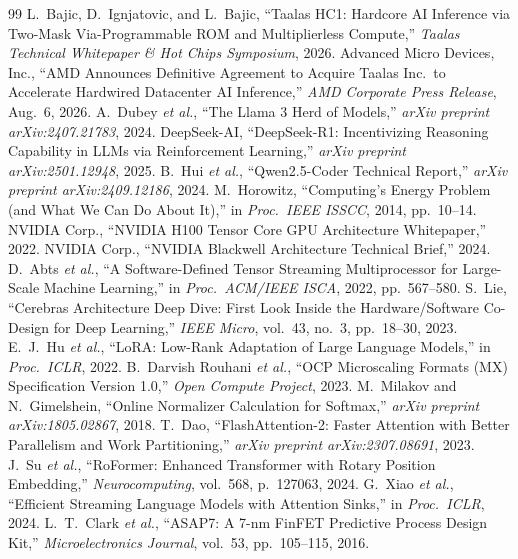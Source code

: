 \documentclass[10pt,journal,compsoc]{IEEEtran}
\begin{document}
\begin{thebibliography}{99}
 L.~Bajic, D.~Ignjatovic, and L.~Bajic, ``Taalas HC1: Hardcore AI Inference via Two-Mask Via-Programmable ROM and Multiplierless Compute,'' \emph{Taalas Technical Whitepaper \& Hot Chips Symposium}, 2026.
 Advanced Micro Devices, Inc., ``AMD Announces Definitive Agreement to Acquire Taalas Inc.\ to Accelerate Hardwired Datacenter AI Inference,'' \emph{AMD Corporate Press Release}, Aug.\ 6, 2026.
 A.~Dubey \emph{et al.}, ``The Llama 3 Herd of Models,'' \emph{arXiv preprint arXiv:2407.21783}, 2024.
 DeepSeek-AI, ``DeepSeek-R1: Incentivizing Reasoning Capability in LLMs via Reinforcement Learning,'' \emph{arXiv preprint arXiv:2501.12948}, 2025.
 B.~Hui \emph{et al.}, ``Qwen2.5-Coder Technical Report,'' \emph{arXiv preprint arXiv:2409.12186}, 2024.
 M.~Horowitz, ``Computing's Energy Problem (and What We Can Do About It),'' in \emph{Proc.\ IEEE ISSCC}, 2014, pp.\ 10--14.
 NVIDIA Corp., ``NVIDIA H100 Tensor Core GPU Architecture Whitepaper,'' 2022.
 NVIDIA Corp., ``NVIDIA Blackwell Architecture Technical Brief,'' 2024.
 D.~Abts \emph{et al.}, ``A Software-Defined Tensor Streaming Multiprocessor for Large-Scale Machine Learning,'' in \emph{Proc.\ ACM/IEEE ISCA}, 2022, pp.\ 567--580.
 S.~Lie, ``Cerebras Architecture Deep Dive: First Look Inside the Hardware/Software Co-Design for Deep Learning,'' \emph{IEEE Micro}, vol.\ 43, no.\ 3, pp.\ 18--30, 2023.
 E.~J.~Hu \emph{et al.}, ``LoRA: Low-Rank Adaptation of Large Language Models,'' in \emph{Proc.\ ICLR}, 2022.
 B.~Darvish Rouhani \emph{et al.}, ``OCP Microscaling Formats (MX) Specification Version 1.0,'' \emph{Open Compute Project}, 2023.
 M.~Milakov and N.~Gimelshein, ``Online Normalizer Calculation for Softmax,'' \emph{arXiv preprint arXiv:1805.02867}, 2018.
 T.~Dao, ``FlashAttention-2: Faster Attention with Better Parallelism and Work Partitioning,'' \emph{arXiv preprint arXiv:2307.08691}, 2023.
 J.~Su \emph{et al.}, ``RoFormer: Enhanced Transformer with Rotary Position Embedding,'' \emph{Neurocomputing}, vol.\ 568, p.\ 127063, 2024.
 G.~Xiao \emph{et al.}, ``Efficient Streaming Language Models with Attention Sinks,'' in \emph{Proc.\ ICLR}, 2024.
 L.~T.~Clark \emph{et al.}, ``ASAP7: A 7-nm FinFET Predictive Process Design Kit,'' \emph{Microelectronics Journal}, vol.\ 53, pp.\ 105--115, 2016.

\end{thebibliography}
\end{document}
